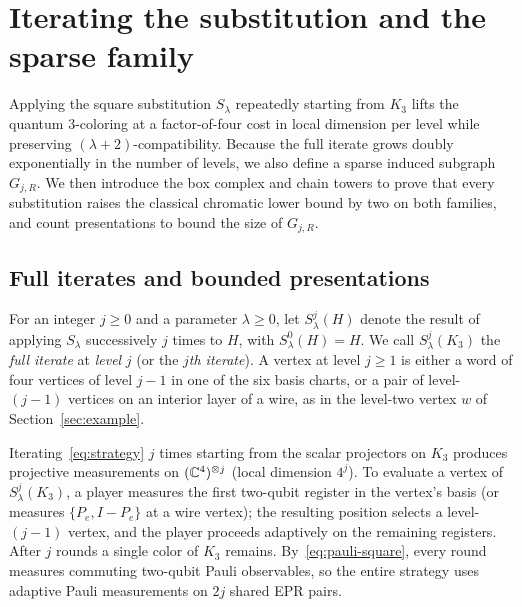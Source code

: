 \section{Iterating the substitution and the sparse family}\label{sec:iteration}

Applying the square substitution $S_\lambda$ repeatedly starting from $K_3$ lifts the quantum $3$-coloring at a factor-of-four cost in local dimension per level while preserving $(\lambda+2)$-compatibility. Because the full iterate grows doubly exponentially in the number of levels, we also define a sparse induced subgraph $G_{j,R}$. We then introduce the box complex and chain towers to prove that every substitution raises the classical chromatic lower bound by two on both families, and count presentations to bound the size of $G_{j,R}$.

\subsection{Full iterates and bounded presentations}\label{sec:sparse}

For an integer $j\ge0$ and a parameter $\lambda\ge0$, let $S^j_\lambda(H)$ denote the result of applying $S_\lambda$ successively $j$ times to $H$, with $S^0_\lambda(H)=H$. We call $S^j_\lambda(K_3)$ the \emph{full iterate} at \emph{level} $j$ (or the \emph{$j$th iterate}). A vertex at level $j\ge1$ is either a word of four vertices of level $j-1$ in one of the six basis charts, or a pair of level-$(j-1)$ vertices on an interior layer of a wire, as in the level-two vertex $w$ of Section~\ref{sec:example}.

Iterating~\eqref{eq:strategy} $j$ times starting from the scalar projectors on $K_3$ produces projective measurements on $(\mathbb C^4)^{\otimes j}$ (local dimension $4^j$). To evaluate a vertex of $S^j_\lambda(K_3)$, a player measures the first two-qubit register in the vertex's basis (or measures $\{P_e,I-P_e\}$ at a wire vertex); the resulting position selects a level-$(j-1)$ vertex, and the player proceeds adaptively on the remaining registers. After $j$ rounds a single color of $K_3$ remains. By~\eqref{eq:pauli-square}, every round measures commuting two-qubit Pauli observables, so the entire strategy uses adaptive Pauli measurements on $2j$ shared EPR pairs.

